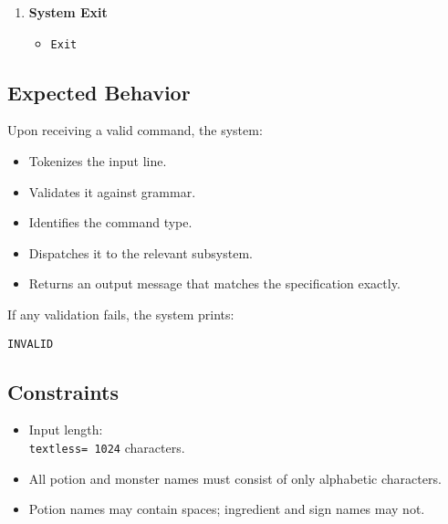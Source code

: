 \documentclass{article}
\begin{document}
\begin{enumerate}
  \item \textbf{System Exit}
    \begin{itemize}
      \item \texttt{Exit}
    \end{itemize}
\end{enumerate}

\subsection*{Expected Behavior}
Upon receiving a valid command, the system:
\begin{itemize}
  \item Tokenizes the input line.
  \item Validates it against grammar.
  \item Identifies the command type.
  \item Dispatches it to the relevant subsystem.
  \item Returns an output message that matches the specification exactly.
\end{itemize}

If any validation fails, the system prints:
\begin{center}
  \texttt{INVALID}
\end{center}

\subsection*{Constraints}
\begin{itemize}
  \item Input length: \texttt{\\textless= 1024} characters.
  \item All potion and monster names must consist of only alphabetic characters.
  \item Potion names may contain spaces; ingredient and sign names may not.
 
\end{itemize}
\end{document}
